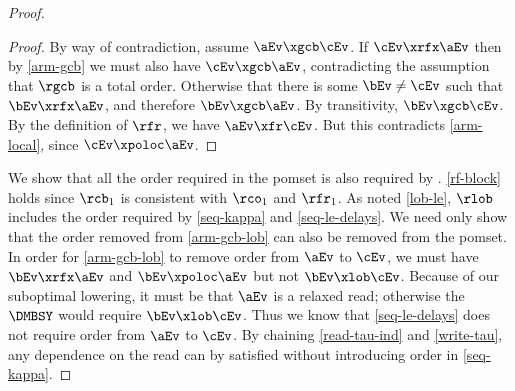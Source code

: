 \begin{theorem}
\begin{proof}
\begin{lemma}
      \vspace{-.5\baselineskip}
      \begin{proof}
        By way of contradiction, assume $\aEv\xgcb\cEv$.  If $\cEv\xrfx\aEv$
        then by \ref{arm-gcb} we must also have $\cEv\xgcb\aEv$,
        contradicting the assumption that $\rgcb$ is a total order.
        Otherwise that there is some $\bEv\neq\cEv$ such that
        $\bEv\xrfx\aEv$, and therefore $\bEv\xgcb\aEv$.  By transitivity,
        $\bEv\xgcb\cEv$.  By the definition of $\rfr$, we have
        $\aEv\xfr\cEv$.  But this contradicts \ref{arm-local}, since
        $\cEv\xpoloc\aEv$.
      \end{proof}
    \end{lemma}
    We show that all the order required in the pomset is also required by
    \armeight{}.  \ref{rf-block} holds since ${\rcb_1}$ is consistent with
    ${\rco_1}$ and ${\rfr_1}$.  As noted \ref{lob-le}, $\rlob$ includes the order
    required by \ref{seq-kappa} and \ref{seq-le-delays}.  We need only show
    that the order removed from \ref{arm-gcb-lob} can also be removed from
    the pomset.  In order for \ref{arm-gcb-lob} to remove order from $\aEv$
    to $\cEv$, we must have $\bEv\xrfx\aEv$ and $\bEv\xpoloc\aEv$ but not
    $\bEv\xlob\cEv$.  Because of our suboptimal lowering, it must be that
    $\aEv$ is a relaxed read; otherwise the $\DMBSY$ would require
    $\bEv\xlob\cEv$.  Thus we know that \ref{seq-le-delays} does not require
    order from $\aEv$ to $\cEv$.  By chaining \ref{read-tau-ind} and
    \ref{write-tau}, any dependence on the read can by satisfied without
    introducing order in \ref{seq-kappa}.
  \end{proof}  
\end{theorem}





